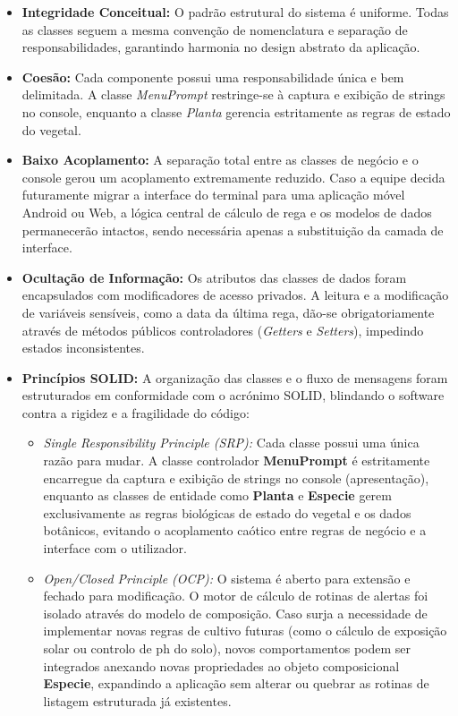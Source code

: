 \documentclass[a4paper,12pt]{article}
\begin{document}
\begin{itemize}[leftmargin=*]
    \item \textbf{Integridade Conceitual:} O padrão estrutural do sistema é uniforme. Todas as classes seguem a mesma convenção de nomenclatura e separação de responsabilidades, garantindo harmonia no design abstrato da aplicação.
    \item \textbf{Coesão:} Cada componente possui uma responsabilidade única e bem delimitada. A classe \textit{MenuPrompt} restringe-se à captura e exibição de strings no console, enquanto a classe \textit{Planta} gerencia estritamente as regras de estado do vegetal.
    \item \textbf{Baixo Acoplamento:} A separação total entre as classes de negócio e o console gerou um acoplamento extremamente reduzido. Caso a equipe decida futuramente migrar a interface do terminal para uma aplicação móvel Android ou Web, a lógica central de cálculo de rega e os modelos de dados permanecerão intactos, sendo necessária apenas a substituição da camada de interface.
    \item \textbf{Ocultação de Informação:} Os atributos das classes de dados foram encapsulados com modificadores de acesso privados. A leitura e a modificação de variáveis sensíveis, como a data da última rega, dão-se obrigatoriamente através de métodos públicos controladores (\textit{Getters} e \textit{Setters}), impedindo estados inconsistentes.
    \item \textbf{Princípios SOLID:} A organização das classes e o fluxo de mensagens foram estruturados em conformidade com o acrónimo SOLID, blindando o software contra a rigidez e a fragilidade do código:
    \begin{itemize}[label=$\circ$, leftmargin=1.5em]
        \item \textit{Single Responsibility Principle (SRP):} Cada classe possui uma única razão para mudar. A classe controlador \textbf{MenuPrompt} é estritamente encarregue da captura e exibição de strings no console (apresentação), enquanto as classes de entidade como \textbf{Planta} e \textbf{Especie} gerem exclusivamente as regras biológicas de estado do vegetal e os dados botânicos, evitando o acoplamento caótico entre regras de negócio e a interface com o utilizador.
        \item \textit{Open/Closed Principle (OCP):} O sistema é aberto para extensão e fechado para modificação. O motor de cálculo de rotinas de alertas foi isolado através do modelo de composição. Caso surja a necessidade de implementar novas regras de cultivo futuras (como o cálculo de exposição solar ou controlo de ph do solo), novos comportamentos podem ser integrados anexando novas propriedades ao objeto composicional \textbf{Especie}, expandindo a aplicação sem alterar ou quebrar as rotinas de listagem estruturada já existentes.

\end{itemize}
\end{itemize}
\end{document}
